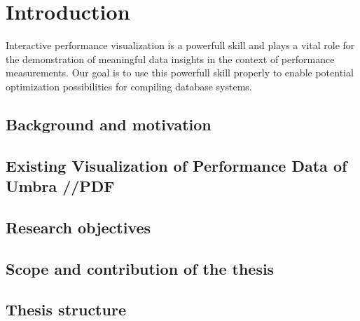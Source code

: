 
\chapter{Introduction}\label{chapter:introduction}
Interactive performance visualization is a powerfull skill and plays a vital role for the demonstration of meaningful data insights in the context of performance measurements. Our goal is to use this powerfull skill properly to enable potential optimization possibilities for compiling database systems.

\section{Background and motivation}
\section{Existing Visualization of Performance Data of Umbra //PDF }
\section{Research objectives}
\section{Scope and contribution of the thesis}
\section{Thesis structure}

